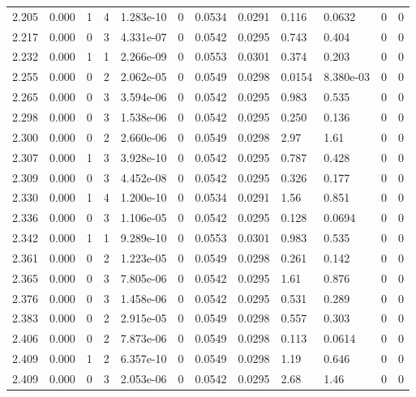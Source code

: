 \documentclass[preview]{standalone}
\begin{document}
{{{{\begin{tabular}{L{1.2cm}C{1.2cm} C{0.3cm}C{0.5cm} C{1.4cm}C{1.4cm} C{1.4cm}C{1.4cm} C{1.6cm}C{1.6cm} C{1.6cm}C{1.6cm}}
  2.205  &  0.000  & 1     &  4 &  1.283e-10  & 0  &  0.0534&   0.0291& 0.116 & 0.0632   &  0 & 0  \\ 
  2.217  &  0.000  & 0     &  3 &  4.331e-07  & 0  &  0.0542&   0.0295& 0.743 & 0.404   &  0 & 0  \\ 
  2.232  &  0.000  & 1     &  1 &  2.266e-09  & 0  &  0.0553&   0.0301& 0.374 & 0.203   &  0 & 0  \\ 
  2.255  &  0.000  & 0     &  2 &  2.062e-05  & 0  &  0.0549&   0.0298& 0.0154 & 8.380e-03   &  0 & 0  \\ 
  2.265  &  0.000  & 0     &  3 &  3.594e-06  & 0  &  0.0542&   0.0295& 0.983 & 0.535   &  0 & 0  \\ 
  2.298  &  0.000  & 0     &  3 &  1.538e-06  & 0  &  0.0542&   0.0295& 0.250 & 0.136   &  0 & 0  \\ 
  2.300  &  0.000  & 0     &  2 &  2.660e-06  & 0  &  0.0549&   0.0298& 2.97 & 1.61   &  0 & 0  \\ 
  2.307  &  0.000  & 1     &  3 &  3.928e-10  & 0  &  0.0542&   0.0295& 0.787 & 0.428   &  0 & 0  \\ 
  2.309  &  0.000  & 0     &  3 &  4.452e-08  & 0  &  0.0542&   0.0295& 0.326 & 0.177   &  0 & 0  \\ 
  2.330  &  0.000  & 1     &  4 &  1.200e-10  & 0  &  0.0534&   0.0291& 1.56 & 0.851   &  0 & 0  \\ 
  2.336  &  0.000  & 0     &  3 &  1.106e-05  & 0  &  0.0542&   0.0295& 0.128 & 0.0694   &  0 & 0  \\ 
  2.342  &  0.000  & 1     &  1 &  9.289e-10  & 0  &  0.0553&   0.0301& 0.983 & 0.535   &  0 & 0  \\ 
  2.361  &  0.000  & 0     &  2 &  1.223e-05  & 0  &  0.0549&   0.0298& 0.261 & 0.142   &  0 & 0  \\ 
  2.365  &  0.000  & 0     &  3 &  7.805e-06  & 0  &  0.0542&   0.0295& 1.61 & 0.876   &  0 & 0  \\ 
  2.376  &  0.000  & 0     &  3 &  1.458e-06  & 0  &  0.0542&   0.0295& 0.531 & 0.289   &  0 & 0  \\ 
  2.383  &  0.000  & 0     &  2 &  2.915e-05  & 0  &  0.0549&   0.0298& 0.557 & 0.303   &  0 & 0  \\ 
  2.406  &  0.000  & 0     &  2 &  7.873e-06  & 0  &  0.0549&   0.0298& 0.113 & 0.0614   &  0 & 0  \\ 
  2.409  &  0.000  & 1     &  2 &  6.357e-10  & 0  &  0.0549&   0.0298& 1.19 & 0.646   &  0 & 0  \\ 
  2.409  &  0.000  & 0     &  3 &  2.053e-06  & 0  &  0.0542&   0.0295& 2.68 & 1.46   &  0 & 0  \\ 

\end{tabular}}}}}
\end{document}
